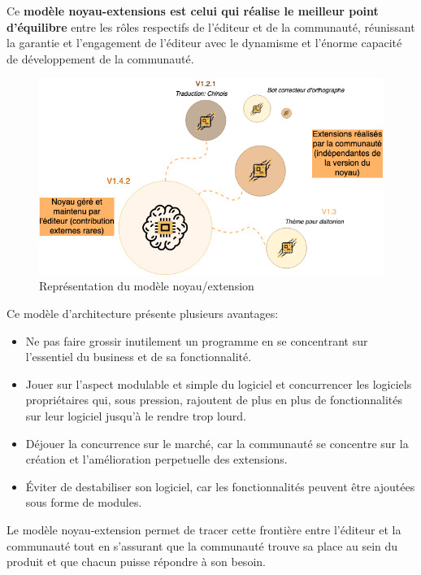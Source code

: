 				Ce \textbf{modèle noyau-extensions est celui qui réalise le meilleur point d'équilibre} entre les rôles respectifs de l'éditeur et de la communauté, réunissant la garantie et l'engagement de l'éditeur avec le dynamisme et l'énorme capacité de développement de la communauté.

				\begin{figure}[!htb]
					\center
					\includegraphics[scale=0.60]{./img/noyauextension_os.png}
					\caption{Représentation du modèle noyau/extension}					
				\end{figure}

				Ce modèle d'architecture présente plusieurs avantages:

				\begin{itemize}[label=\textbullet, font=\LARGE \color{burntorange}]
					\item Ne pas faire grossir inutilement un programme en se concentrant sur l'essentiel du business et de sa fonctionnalité.
					\item Jouer sur l'aspect modulable et simple du logiciel et concurrencer les logiciels propriétaires qui, sous pression, rajoutent de plus en plus de fonctionnalités sur leur logiciel jusqu'à le rendre trop lourd.
					\item Déjouer la concurrence sur le marché, car la communauté se concentre sur la création et l'amélioration perpetuelle des extensions.
					\item Éviter de destabiliser son logiciel, car les fonctionnalités peuvent être ajoutées sous forme de modules.
				\end{itemize}

				Le modèle noyau-extension permet de tracer cette frontière entre l'éditeur et la communauté tout en s'assurant que la communauté trouve sa place au sein du produit et que chacun puisse répondre à son besoin.

